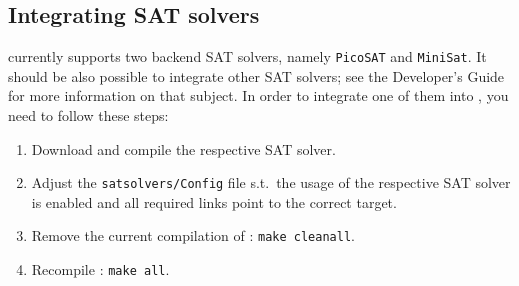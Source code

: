 

\subsection{Integrating SAT solvers}

\pgsolver currently supports two backend SAT solvers, namely \texttt{PicoSAT} and
\texttt{MiniSat}. It should be also possible to integrate other SAT solvers; see the Developer's Guide for
more information on that subject. In order to integrate one of them into \pgsolver, you need to follow these
steps:
\begin{enumerate}
\item Download and compile the respective SAT solver.
\item Adjust the \texttt{satsolvers/Config} file s.t.\ the usage of the respective SAT solver is enabled and all required links point to the correct target.
\item Remove the current compilation of \pgsolver: \verb#make cleanall#.
\item Recompile \pgsolver: \verb#make all#.
\end{enumerate}




